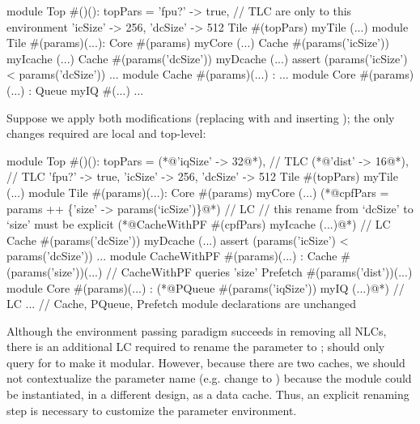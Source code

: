 \begin{phdl}
module Top #()():
  topPars = {'fpu?'   -> true, // TLC are only to this environment 
             'icSize' -> 256,
             'dcSize' -> 512}
  Tile #(topPars) myTile (...)
module Tile #(params)(...):
  Core  #(params) myCore (...)
  Cache #(params('icSize')) myIcache (...)
  Cache #(params('dcSize')) myDcache (...)
  assert (params('icSize') < params('dcSize')) ...
module Cache #(params)(...) : ...
module Core  #(params)(...) :
  Queue myIQ #(...) ...
\end{phdl} 

Suppose we apply both modifications (replacing  with  and inserting ); the only changes required are local and top-level:

\begin{phdl}
module Top #()():
  topPars = {(*@\textcolor[rgb]{0.8,0,0}{'iqSize' -> 32}@*),                                     // TLC
             (*@\textcolor[rgb]{1,0,0}{'dist' -> 16}@*),                                       // TLC
             'fpu?'   -> true,
             'icSize' -> 256,
             'dcSize' -> 512}
  Tile #(topPars) myTile (...)
module Tile #(params)(...):
  Core  #(params) myCore (...)
  (*@\textcolor[rgb]{1,0,0}{cpfPars = params ++ \{'size' -> params(`icSize')\}}@*)               // LC
    // this rename from `dcSize' to `size' must be explicit
  (*@\textcolor[rgb]{1,0,0}{CacheWithPF \#(cpfPars) myIcache (...)}@*)                          // LC
  Cache #(params('dcSize')) myDcache (...)
  assert (params('icSize') < params('dcSize')) ...
module CacheWithPF #(params)(...) :
  Cache #(params('size'))(...) // CacheWithPF queries 'size'
  Prefetch #(params('dist'))(...)
module Core #(params)(...) :
  (*@\textcolor[rgb]{.8,0,0}{PQueue \#(params('iqSize')) myIQ (...)}@*)                          // LC
... // Cache, PQueue, Prefetch module declarations are unchanged
\end{phdl} 

Although the environment passing paradigm succeeds in removing all NLCs, there is an additional LC required to rename the  parameter to ; 
 should only query for  to make it modular. 
However, because there are two caches, we should not contextualize the parameter name (e.g. change  to ) because the module could be instantiated, in a different design, as a data cache. 
Thus, an explicit renaming step is necessary to customize the  parameter environment.

